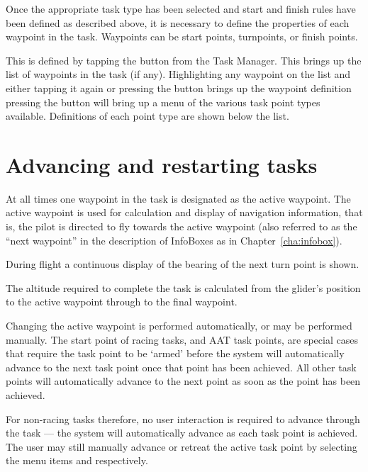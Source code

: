 Once the appropriate task type has been selected and start and finish rules have been defined as described above, it is necessary to define the properties of each waypoint in the task.  Waypoints can be start points, turnpoints, or finish points.

This is defined by tapping the  button from the Task Manager.  This brings up the list of waypoints in the task (if any).  Highlighting any waypoint on the list and either tapping it again or pressing the  button brings up the waypoint definition pressing the  button  will bring up a menu of the various task point types available.  Definitions of each point type are shown below the list.


\section{Advancing and restarting tasks}\label{sec:advanc-rest-tasks}
At all times one waypoint in the task is designated as the active
waypoint.  The active waypoint is used for calculation and display of
navigation information, that is, the pilot is directed to fly towards
the active waypoint (also referred to as the ``next waypoint'' in the
description of InfoBoxes as in Chapter~\ref{cha:infobox}).

During flight a continuous display of the bearing of the next turn
point is shown.

The altitude required to complete the task is calculated from the
glider's position to the active waypoint through to the final
waypoint.

Changing the active waypoint is performed automatically, or may be performed manually.
The start point of racing tasks, and AAT task points, are special cases that require
the task point to be `armed' before the system will automatically advance to the next
task point once that point has been achieved.  All other task points will automatically
advance to the next point as soon as the point has been achieved.

For non-racing tasks therefore, no user interaction is required to
advance through the task --- the system will automatically advance as
each task point is achieved.  The user may still manually advance or retreat the active
task point by selecting the menu items \blink{} and
\blink{} respectively.

